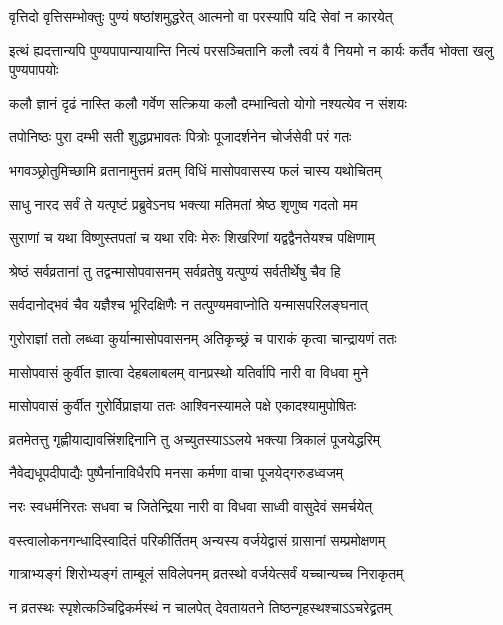 \twolineshloka
{वृत्तिदो वृत्तिसम्भोक्तुः पुण्यं षष्ठांशमुद्धरेत्}
{आत्मनो वा परस्यापि यदि सेवां न कारयेत्} %

\twolineshloka
{इत्थं ह्यदत्तान्यपि पुण्यपापान्यायान्ति नित्यं परसञ्चितानि}
{कलौ त्वयं वै नियमो न कार्यः कर्तैव भोक्ता खलु पुण्यपापयोः} %

\twolineshloka
{कलौ ज्ञानं दृढं नास्ति कलौ गर्वेण सत्क्रिया}
{कलौ दम्भान्वितो योगो नश्यत्येव न संशयः} %

\twolineshloka
{तपोनिष्ठः पुरा दम्भी सती शुद्धप्रभावतः}
{पित्रोः पूजादर्शनेन चोर्जसेवी परं गतः} %


\twolineshloka
{भगवञ्छ्रोतुमिच्छामि व्रतानामुत्तमं व्रतम्}
{विधिं मासोपवासस्य फलं चास्य यथोचितम्} %


\twolineshloka
{साधु नारद सर्वं ते यत्पृष्टं प्रब्रुवेऽनघ}
{भक्त्या मतिमतां श्रेष्ठ शृणुष्व गदतो मम} %

\twolineshloka
{सुराणां च यथा विष्णुस्तपतां च यथा रविः}
{मेरुः शिखरिणां यद्वद्वैनतेयश्च पक्षिणाम्} %

\twolineshloka
{श्रेष्ठं सर्वव्रतानां तु तद्वन्मासोपवासनम्}
{सर्वव्रतेषु यत्पुण्यं सर्वतीर्थेषु चैव हि} %

\twolineshloka
{सर्वदानोद्भवं चैव यज्ञैश्च भूरिदक्षिणैः}
{न तत्पुण्यमवाप्नोति यन्मासपरिलङ्घनात्} %

\twolineshloka
{गुरोराज्ञां ततो लब्ध्वा कुर्यान्मासोपवासनम्}
{अतिकृच्छ्रं च पाराकं कृत्वा चान्द्रायणं ततः} %

\twolineshloka
{मासोपवासं कुर्वीत ज्ञात्वा देहबलाबलम्}
{वानप्रस्थो यतिर्वापि नारी वा विधवा मुने} %

\twolineshloka
{मासोपवासं कुर्वीत गुरोर्विप्राज्ञया ततः}
{आश्विनस्यामले पक्षे एकादश्यामुपोषितः} %

\twolineshloka
{व्रतमेतत्तु गृह्णीयाद्यावत्त्रिंशद्दिनानि तु}
{अच्युतस्याऽऽलये भक्त्या त्रिकालं पूजयेद्धरिम्} %

\twolineshloka
{नैवेद्यधूपदीपाद्यैः पुष्पैर्नानाविधैरपि}
{मनसा कर्मणा वाचा पूजयेद्गरुडध्वजम्} %

\twolineshloka
{नरः स्वधर्मनिरतः सधवा च जितेन्द्रिया}
{नारी वा विधवा साध्वी वासुदेवं समर्चयेत्} %

\twolineshloka
{वस्त्वालोकनगन्धादिस्वादितं परिकीर्तितम्}
{अन्यस्य वर्जयेद्वासं ग्रासानां सम्प्रमोक्षणम्} %

\twolineshloka
{गात्राभ्यङ्गं शिरोभ्यङ्गं ताम्बूलं सविलेपनम्}
{व्रतस्थो वर्जयेत्सर्वं यच्चान्यच्च निराकृतम्} %

\twolineshloka
{न व्रतस्थः स्पृशेत्कञ्चिद्विकर्मस्थं न चालपेत्}
{देवतायतने तिष्ठन्गृहस्थश्चाऽऽचरेद्व्रतम्} %

